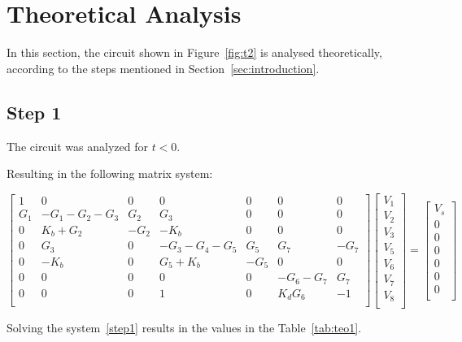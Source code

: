 \section{Theoretical Analysis}
\label{sec:analysis}

In this section, the circuit shown in Figure~\ref{fig:t2} is analysed
theoretically, according to the steps mentioned in Section~\ref{sec:introduction}.

\subsection{Step 1}
The circuit was analyzed for $t<0$.

Resulting in the following matrix system:

\begin{equation}\label{step1}
  \begin{bmatrix}
    1 & 0 & 0 & 0 & 0 & 0 & 0 \\
    G_1 & -G_1-G_2-G_3 & G_2 & G_3 & 0 & 0 & 0 \\
    0 & K_b+G_2 & -G_2 & -K_b & 0 & 0 & 0 \\
    0 & G_3 & 0 & -G_3-G_4-G_5 & G_5 & G_7 & -G_7 \\
    0 & -K_b & 0 & G_5+K_b & -G_5 & 0 & 0 \\
    0 & 0 & 0 & 0 & 0 & -G_6-G_7 & G_7 \\
    0 & 0 & 0 & 1 & 0 & K_dG_6 & -1 \\
  \end{bmatrix}
  \begin{bmatrix}
    V_1\\
    V_2\\
    V_3\\
    V_5\\
    V_6\\
    V_7\\
    V_8\\
  \end{bmatrix}
  =
  \begin{bmatrix}
    V_s\\
    0\\
    0\\
    0\\
    0\\
    0\\
    0\\
  \end{bmatrix}
\end{equation}

Solving the system~\ref{step1} results in the values in the Table~\ref{tab:teo1}.

